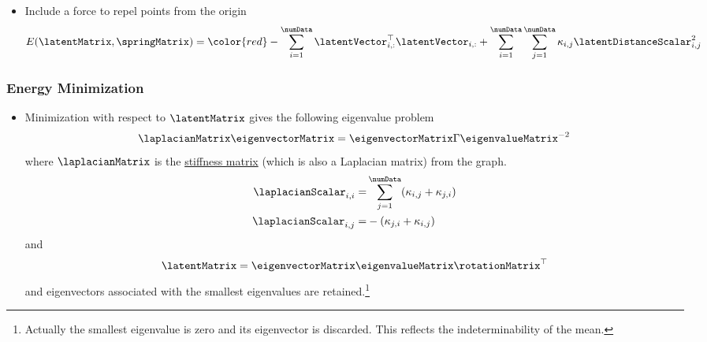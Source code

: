 \begin{figure}
\begin{comment}
        \renewcommand{\startPoint}{\pgfpartway{1.2}{\pgfxy(0.5, 0.5)}{\pgfxy(0.322, 0.23)}}
        \renewcommand{\finishPoint}{\pgfpartway{1.35}{\pgfxy(0.5, 0.5)}{\startPoint}}
        \pgfline{\startPoint}{\finishPoint}
        \renewcommand{\startPoint}{\pgfpartway{1.2}{\pgfxy(0.5, 0.5)}{\pgfxy(0.295, 0.43)}}
        \renewcommand{\finishPoint}{\pgfpartway{1.35}{\pgfxy(0.5, 0.5)}{\startPoint}}
        \pgfline{\startPoint}{\finishPoint}
        \renewcommand{\startPoint}{\pgfpartway{1.2}{\pgfxy(0.5, 0.5)}{\pgfxy(0.03, 0.21)}}
        \renewcommand{\finishPoint}{\pgfpartway{1.35}{\pgfxy(0.5, 0.5)}{\startPoint}}
        \pgfline{\startPoint}{\finishPoint}
        \renewcommand{\startPoint}{\pgfpartway{1.2}{\pgfxy(0.5, 0.5)}{\pgfxy(0.364, 0.03)}}
        \renewcommand{\finishPoint}{\pgfpartway{1.35}{\pgfxy(0.5, 0.5)}{\startPoint}}
        \pgfline{\startPoint}{\finishPoint}
        \renewcommand{\startPoint}{\pgfpartway{1.2}{\pgfxy(0.5, 0.5)}{\pgfxy(0.66, 0.25)}}
        \renewcommand{\finishPoint}{\pgfpartway{1.35}{\pgfxy(0.5, 0.5)}{\startPoint}}
        \pgfline{\startPoint}{\finishPoint}
    }
  \end{pgfpicture}
  \end{comment}
\end{figure}
\begin{itemize}
\item Include a force to repel points from the origin
  {\small \[
    E(\latentMatrix, \springMatrix) = {\color{red} -\sum_{i=1}^\numData \latentVector_{i,:}^\top \latentVector_{i,:}} + \sum_{i=1}^\numData \sum_{j=1}^\numData \kappa_{i,j} \latentDistanceScalar_{i,j}^2
    \]
  }
\end{itemize}




\subsubsection{Energy Minimization}

\begin{itemize}
\item Minimization with respect to $\latentMatrix$ gives the following eigenvalue problem
  \[
  \laplacianMatrix \eigenvectorMatrix = \eigenvectorMatrix \Gamma \eigenvalueMatrix^{-2}
  \]      
  where $\laplacianMatrix$ is the \href{http://en.wikipedia.org/wiki/Stiffness_matrix}{stiffness matrix} (which is also a Laplacian matrix) from the
  graph. 
  \begin{align*}
    \laplacianScalar_{i,i} = & \sum_{j=1}^\numData(\kappa_{i,j} + \kappa_{j,i}) \\
    \laplacianScalar_{i,j} = &-(\kappa_{j,i} +
    \kappa_{i,j})
  \end{align*}
  and 
  \[
  \latentMatrix = \eigenvectorMatrix
  \eigenvalueMatrix \rotationMatrix^\top
  \] 
  and eigenvectors associated with the smallest eigenvalues are retained.\footnote{Actually the smallest eigenvalue is zero and its eigenvector is discarded. This reflects the indeterminability of the mean.}
\end{itemize}




